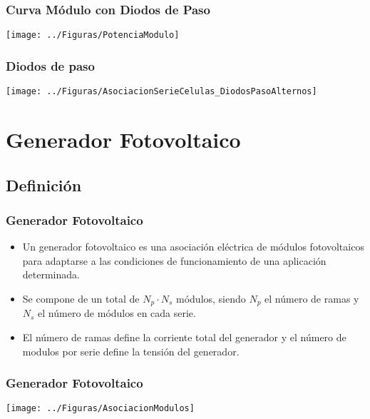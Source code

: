 \documentclass[xcolor=dvipsnames]{beamer}
\begin{document}
\begin{frame}
  \frametitle{Curva Módulo con Diodos de Paso}

  \begin{center}
    \texttt{[image: ../Figuras/PotenciaModulo]}
    \par\end{center}


\end{frame}

\begin{frame}
  \frametitle{Diodos de paso}

  \begin{center}
    \texttt{[image: ../Figuras/AsociacionSerieCelulas\_DiodosPasoAlternos]}
    \par\end{center}

\end{frame}

\section{Generador Fotovoltaico}


\subsection{Definición}

\begin{frame}
  \frametitle{Generador Fotovoltaico}
  \begin{itemize}
  \item Un generador fotovoltaico es una asociación eléctrica de
    módulos fotovoltaicos para adaptarse a las condiciones de
    funcionamiento de una aplicación determinada.
  \item Se compone de un total de $N_{p}\cdot N_{s}$ módulos, siendo
    $N_{p}$ el número de ramas y $N_{s}$ el número de módulos en cada
    serie.
  \item El número de ramas define la corriente total del generador y
    el número de modulos por serie define la tensión del generador.
  \end{itemize}

\end{frame}

\begin{frame}
  \frametitle{Generador Fotovoltaico}

  \begin{center}
    \texttt{[image: ../Figuras/AsociacionModulos]}
    \par\end{center}
\end{frame}
\end{document}
